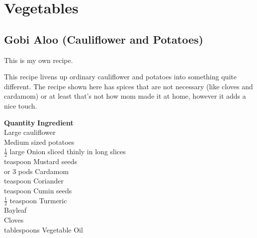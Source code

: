 \chapter{Vegetables}

\section{Gobi Aloo (Cauliflower and Potatoes)}
  This is my own recipe.

  This  recipe  livens  up ordinary cauliflower and potatoes into something
quite different.  The recipe shown here has spices that are not necessary (like
cloves and cardamom) or at least that's not how mom made it at home, however it
adds a nice touch.

\begin{tabbing}
\hspace{1.0cm}  \={\bf Quantity}   \hspace{3.0cm} \={\bf Ingredient}\\
  \>Large  cauliflower \\
     \>Medium sized potatoes \\
\>$\frac{1}{2}$ large   \>Onion   sliced thinly in long slices\\
 teaspoon   \>Mustard seeds \\
 or 3 pods   \>Cardamom \\
  teaspoon   \>Coriander\\
 teaspoon   \>Cumin seeds \\
\>$\frac{1}{2}$ teaspoon   \>Turmeric \\
   \>Bayleaf \\
   \>Cloves \\
 tablespoons   \>Vegetable Oil \\
\end{tabbing}

